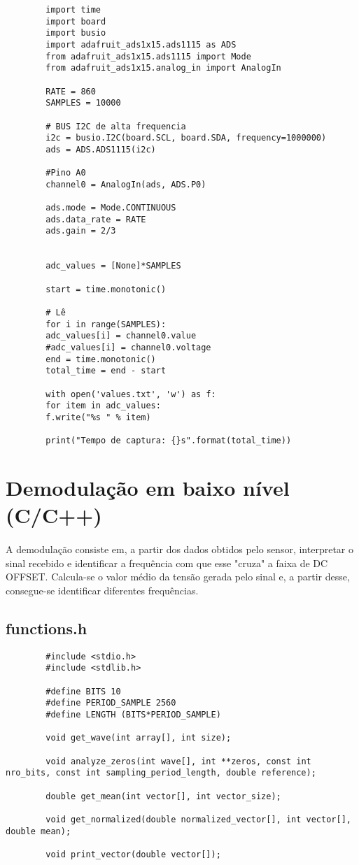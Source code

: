 \documentclass[11pt,a4paper]{report}
\begin{document}
		\begin{verbatim}
		import time
		import board
		import busio
		import adafruit_ads1x15.ads1115 as ADS
		from adafruit_ads1x15.ads1115 import Mode
		from adafruit_ads1x15.analog_in import AnalogIn
		
		RATE = 860
		SAMPLES = 10000
		
		# BUS I2C de alta frequencia
		i2c = busio.I2C(board.SCL, board.SDA, frequency=1000000)
		ads = ADS.ADS1115(i2c)
		
		#Pino A0
		channel0 = AnalogIn(ads, ADS.P0)
		
		ads.mode = Mode.CONTINUOUS
		ads.data_rate = RATE
		ads.gain = 2/3
		
		
		adc_values = [None]*SAMPLES
		
		start = time.monotonic()
		
		# Lê
		for i in range(SAMPLES):
		adc_values[i] = channel0.value
		#adc_values[i] = channel0.voltage
		end = time.monotonic()
		total_time = end - start
		
		with open('values.txt', 'w') as f:
		for item in adc_values:
		f.write("%s " % item)
		
		print("Tempo de captura: {}s".format(total_time))
		\end{verbatim}


	\section{Demodulação em baixo nível (C/C++)}
	\paragraph{}
		A demodulação consiste em, a partir dos dados obtidos pelo sensor, interpretar o sinal recebido e identificar a frequência com que esse "cruza" a faixa de DC OFFSET. Calcula-se o valor médio da tensão gerada pelo sinal e, a partir desse, consegue-se identificar diferentes frequências.
	
	\subsection{functions.h}
		\begin{verbatim}
		#include <stdio.h>
		#include <stdlib.h>
		
		#define BITS 10
		#define PERIOD_SAMPLE 2560
		#define LENGTH (BITS*PERIOD_SAMPLE)
		
		void get_wave(int array[], int size);
		
		void analyze_zeros(int wave[], int **zeros, const int nro_bits, const int sampling_period_length, double reference);
		
		double get_mean(int vector[], int vector_size);
		
		void get_normalized(double normalized_vector[], int vector[], double mean);
		
		void print_vector(double vector[]);
		\end{verbatim}
		
\end{document}
